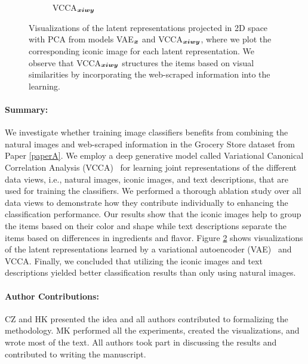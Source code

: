 \begin{figure}
\begin{subfigure}[b]{0.26\textwidth}
		\vspace{-7mm}
		\caption{VCCA$_{{\bm{x}} {\bm{i}} {\bm{w}} {\bm{y}}}$ }
		\label{fig:pca_latents_vcca_xiwy}
	\end{subfigure}
	\vspace{-6mm}
	\captionsetup{width=.46\textwidth}
	\caption{Visualizations of the latent representations projected in 2D space with PCA from models VAE$_{{\bm{x}}}$ and VCCA$_{{\bm{x}} {\bm{i}} {\bm{w}} {\bm{y}}}$, where we plot the corresponding iconic image for each latent representation. We observe that VCCA$_{{\bm{x}} {\bm{i}} {\bm{w}} {\bm{y}}}$ structures the items based on visual similarities by incorporating the web-scraped information into the learning. 
	}
	\label{fig:paperB_pca_latents}
\end{figure} 
\paragraph{Summary:} 
We investigate whether training image classifiers benefits from combining the natural images and web-scraped information in the Grocery Store dataset from Paper \ref{paperA}. We employ a deep generative model called Variational Canonical Correlation Analysis (VCCA)~\cite{wang2016deep} for learning joint representations of the different data views, i.e., natural images, iconic images, and text descriptions, that are used for training the classifiers. We performed a thorough ablation study over all data views to demonstrate how they contribute individually to enhancing the classification performance. Our results show that the iconic images help to group the items based on their color and shape while text descriptions separate the items based on differences in ingredients and flavor. Figure \ref{fig:paperB_pca_latents} shows visualizations of the latent representations learned by a variational autoencoder (VAE)~\cite{kingma2013auto} and VCCA. Finally, we concluded that utilizing the iconic images and text descriptions yielded better classification results than only using natural images. 

\vspace{-3mm}
\paragraph{Author Contributions:} CZ and HK presented the idea and all authors contributed to formalizing the methodology. MK performed all the experiments, created the visualizations, and wrote most of the text. All authors took part in discussing the results and contributed to writing the manuscript. 



